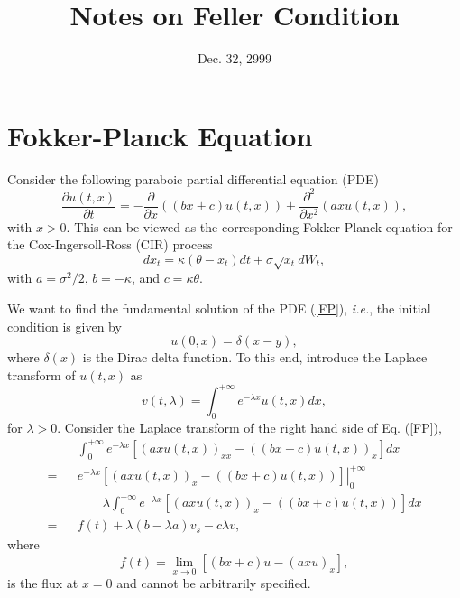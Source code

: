 \documentclass[12pt]{article}
\begin{document}
\title{Notes on Feller Condition}
\date{Dec. 32, 2999}

\maketitle

\section{Fokker-Planck Equation}

  Consider the following paraboic partial differential equation (PDE) \cite{Feller}
  \begin{equation}
    \frac{\partial u(t,x)}{\partial t} = -\frac{\partial}{\partial x}\left((bx+c)u(t,x)\right)
                                       + \frac{\partial^2}{\partial x^2}\left(axu(t,x)\right),
    \label{FP}
  \end{equation}
  with $x>0$. This can be viewed as the corresponding Fokker-Planck equation for the Cox-Ingersoll-Ross (CIR)
  process
  \begin{equation}
    dx_t=\kappa(\theta-x_t)dt + \sigma\sqrt{x_t}dW_t,
  \end{equation}
  with $a=\sigma^2/2$, $b=-\kappa$, and $c=\kappa\theta$.

  We want to find the fundamental solution of the PDE (\ref{FP}), {\it i.e.}, the initial condition is given
  by
  \begin{equation}
    u(0,x)=\delta(x-y),
  \end{equation}
  where $\delta(x)$ is the Dirac delta function. To this end, introduce the Laplace transform of $u(t,x)$ as
  \begin{equation}
    v(t,\lambda)=\int_0^{+\infty}e^{-\lambda x}u(t,x)dx,
  \end{equation}
  for $\lambda > 0$. Consider the Laplace transform of the right hand side of Eq. (\ref{FP}),
  \begin{eqnarray}
      && \int_0^{+\infty} e^{-\lambda x}\left[\left(axu(t,x)\right)_{xx}-\left((bx+c)u(t,x)\right)_x\right]dx \nonumber\\
    = && \left. e^{-\lambda x}\left[\left(axu(t,x)\right)_{x}-\left((bx+c)u(t,x)\right)\right]\right|_0^{+\infty}\nonumber\\
      && \quad\quad \lambda \int_0^{+\infty} e^{-\lambda x}\left[\left(axu(t,x)\right)_{x}-\left((bx+c)u(t,x)\right)\right]dx \nonumber\\
    = && f(t) + \lambda(b-\lambda a)v_s - c\lambda v,
  \end{eqnarray}
  where
  \begin{equation}
    f(t) = \lim_{x\rightarrow 0}\left[(bx+c)u-(axu)_x\right],
  \end{equation}
  is the flux at $x=0$ and cannot be arbitrarily specified.
\end{document}
